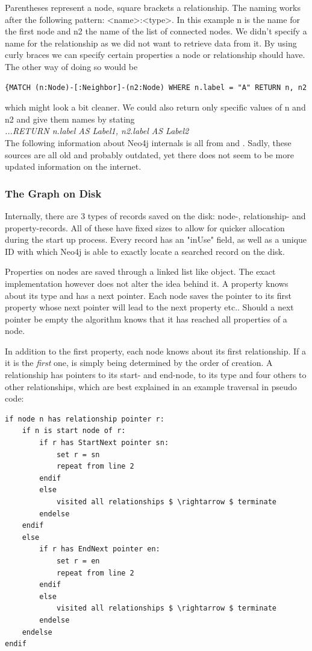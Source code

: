 Parentheses represent a node, square brackets a relationship. The naming works after the following pattern: <name>:<type>. In this example n is the name for the first node and n2 the name of the list of connected nodes. We didn't specify a name for the relationship as we did not want to retrieve data from it. By using curly braces we can specify certain properties a node or relationship should have. The other way of doing so would be 
\begin{lstlisting}[label={ex232},caption={Matching Nodes Way 2}]
{MATCH (n:Node)-[:Neighbor]-(n2:Node) WHERE n.label = "A" RETURN n, n2
\end{lstlisting}
which might look a bit cleaner. We could also return only specific values of n and n2 and give them names by stating \\
\emph{ ...RETURN n.label AS Label1, n2.label AS Label2 }\\
The following information about Neo4j internals is all from \cite{NeoInternals} and \cite{Neo4jInternalsPP}. Sadly, these sources are all old and probably outdated, yet there does not seem to be more updated information on the internet.
\subsubsection{The Graph on Disk}
Internally, there are 3 types of records saved on the disk: node-, relationship- and property-records. All of these have fixed sizes to allow for quicker allocation during the start up process. Every record has an "inUse" field, as well as a unique ID with which Neo4j is able to exactly locate a searched record on the disk. \citep[minute 08]{NeoInternals}

Properties on nodes are saved through a linked list like object. The exact implementation however does not alter the idea behind it. A property knows about its type and has a next pointer. Each node saves the pointer to its first property whose next pointer will lead to the next property etc.. Should a next pointer be empty the algorithm knows that it has reached all properties of a node.

In addition to the first property, each node knows about its first relationship. If a it is the \emph{first} one, is simply being determined by the order of creation. A relationship has pointers to its start- and end-node, to its type and four others to other relationships, which are best explained in an example traversal in pseudo code:
\lstset{language=JavaScript}
\begin{lstlisting}[caption={Algorithm to Save Read the Graph from Disk}]
if node n has relationship pointer r: 
	if n is start node of r: 
		if r has StartNext pointer sn: 
			set r = sn 
			repeat from line 2 
		endif 
		else  
			visited all relationships $ \rightarrow $ terminate
		endelse 
	endif 
	else 
		if r has EndNext pointer en: 
			set r = en 
			repeat from line 2 
		endif 
		else
			visited all relationships $ \rightarrow $ terminate
		endelse 
	endelse 
endif
\end{lstlisting}


